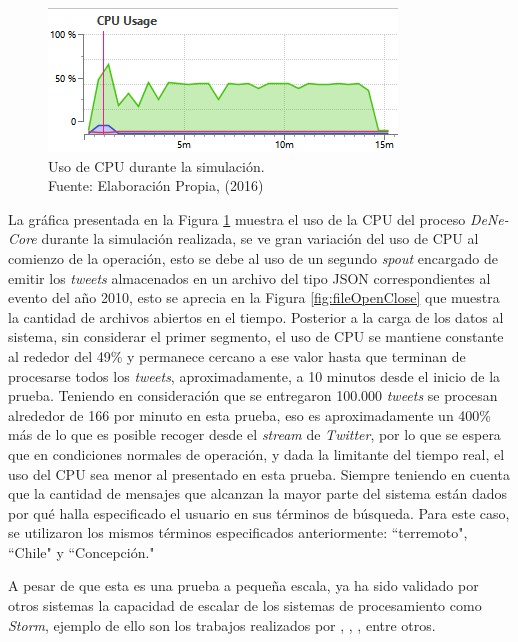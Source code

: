 \begin{figure}[H]
        \centering
        \captionsetup{justification=centering}
        \includegraphics[scale=1.2]{images/CPUUsageN.png}
        \caption[Uso de CPU durante la simulación.]{Uso de CPU durante la simulación.\\Fuente: Elaboración Propia, (2016)}
        \label{fig:cpuUsage}
\end{figure}

La gráfica presentada en la Figura \ref{fig:cpuUsage} muestra el uso de la CPU del proceso \textit{DeNe-Core} durante la simulación realizada, se ve gran variación del uso de CPU al comienzo de la operación, esto se debe al uso de un segundo \textit{spout} encargado de emitir los \textit{tweets} almacenados en un archivo del tipo JSON correspondientes al evento del año 2010, esto se aprecia en la Figura \ref{fig:fileOpenClose} que muestra la cantidad de archivos abiertos en el tiempo. Posterior a la carga de los datos al sistema, sin considerar el primer segmento, el uso de CPU se mantiene constante al rededor del 49\% y permanece cercano a ese valor hasta que terminan de procesarse todos los \textit{tweets}, aproximadamente, a 10 minutos desde el inicio de la prueba. Teniendo en consideración que se entregaron 100.000 \textit{tweets} se procesan alrededor de 166 por minuto en esta prueba, eso es aproximadamente un 400\% más de lo que es posible recoger desde el \textit{stream} de \textit{Twitter}, por lo que se espera que en condiciones normales de operación, y dada la limitante del tiempo real, el uso del CPU sea menor al presentado en esta prueba. Siempre teniendo en cuenta que la cantidad de mensajes que alcanzan la mayor parte del sistema están dados por qué halla especificado el usuario en sus términos de búsqueda. Para este caso, se utilizaron los mismos términos especificados anteriormente: ``terremoto", ``Chile" y ``Concepción."

A pesar de que esta es una prueba a pequeña escala, ya ha sido validado por otros sistemas la capacidad de escalar de los sistemas de procesamiento como \textit{Storm}, ejemplo de ello son los trabajos realizados por \cite{WladdimiroElastic}, \cite{scalingStorm}, \cite{HowSpotifyScalesStorm}, entre otros.

